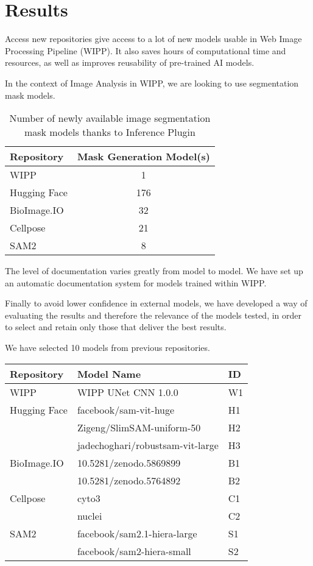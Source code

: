 \section{Results}
\label{sec:results}

Access new repositories give access to a lot of new models usable in Web Image
Processing Pipeline (WIPP). It also saves hours of computational time and
resources, as well as improves reusability of pre-trained AI models.

In the context of Image Analysis in WIPP, we are looking to use segmentation
mask models.

\begin{table}[H]
\centering
\caption{\label{tab:number_of_newly_available_models}%
  Number of newly available image segmentation mask models thanks to Inference Plugin
}
\begin{tabular}{lc}
  \toprule
  Repository & Mask Generation Model(s) \\
  \midrule
  WIPP & 1 \\
  Hugging Face & 176 \\
  BioImage.IO & 32 \\
  Cellpose & 21 \\
  SAM2 & 8 \\
  \bottomrule
\end{tabular}
\end{table}

The level of documentation varies greatly from model to model. We have set up an
automatic documentation system for models trained within WIPP.

Finally to avoid lower confidence in external models, we have developed a way of
evaluating the results and therefore the relevance of the models tested, in
order to select and retain only those that deliver the best results.

We have selected 10 models from previous repositories.

\begin{table}[H]
\centering
\begin{tabular}{lll}
  \toprule
  Repository & Model Name & ID \\
  \midrule
  WIPP & WIPP UNet CNN 1.0.0 & W1 \\
  Hugging Face & facebook/sam-vit-huge & H1 \\
                & Zigeng/SlimSAM-uniform-50 & H2 \\
                & jadechoghari/robustsam-vit-large & H3 \\
  BioImage.IO & 10.5281/zenodo.5869899 & B1 \\
              & 10.5281/zenodo.5764892 & B2 \\
  Cellpose & cyto3 & C1 \\
            & nuclei & C2 \\
  SAM2 & facebook/sam2.1-hiera-large & S1 \\
        & facebook/sam2-hiera-small & S2 \\
  \bottomrule
\end{tabular}
\end{table}

